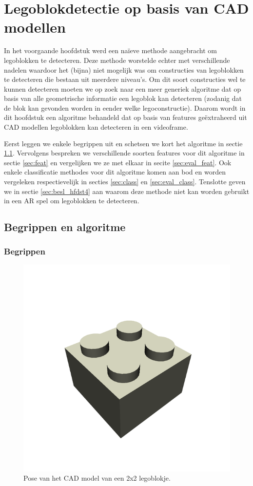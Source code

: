 \chapter{Legoblokdetectie op basis van CAD modellen}
\label{hoofdstuk:3}
In het voorgaande hoofdstuk werd een na\"ieve methode aangebracht om legoblokken te detecteren. Deze methode worstelde echter met verschillende nadelen waardoor het (bijna) niet mogelijk was om constructies van legoblokken te detecteren die bestaan uit meerdere niveau's. Om dit soort constructies wel te kunnen detecteren moeten we op zoek naar een meer generiek algoritme dat op basis van alle geometrische informatie een legoblok kan detecteren (zodanig dat de blok kan gevonden worden in eender welke legoconstructie). Daarom wordt in dit hoofdstuk een algoritme behandeld dat op basis van features ge\"extraheerd uit CAD modellen legoblokken kan detecteren in een videoframe.

Eerst leggen we enkele begrippen uit en schetsen we kort het algoritme in sectie \ref{sec:inl_hfdst4}. Vervolgens bespreken we verschillende soorten features voor dit algoritme in sectie \ref{sec:feat} en vergelijken we ze met elkaar in secite \ref{sec:eval_feat}. Ook enkele classificatie methodes voor dit algoritme komen aan bod en worden vergeleken respectievelijk in secties \ref{sec:class} en \ref{sec:eval_class}. Tenslotte geven we in sectie \ref{sec:besl_hfdst4} aan waarom deze methode niet kan worden gebruikt in een AR spel om legoblokken te detecteren.

\section{Begrippen en algoritme} \label{sec:inl_hfdst4}

\subsection{Begrippen}

\begin{figure}
  \centering
  \includegraphics[width=.5\linewidth]{img/cad}
  \caption{Pose van het CAD model van een 2x2 legoblokje.}
  \label{fig:cad}
\end{figure}

